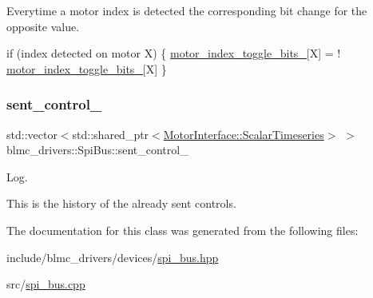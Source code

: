 Everytime a motor index is detected the corresponding bit change for the opposite value. 


\begin{DoxyCode}
\textcolor{keywordflow}{if} (index detected on motor X)
\{
    \hyperlink{classblmc__drivers_1_1SpiBus_a5805dd95171df8f26efdae85ea02662c}{motor\_index\_toggle\_bits\_}[X] = !
      \hyperlink{classblmc__drivers_1_1SpiBus_a5805dd95171df8f26efdae85ea02662c}{motor\_index\_toggle\_bits\_}[X]
\}
\end{DoxyCode}
 \mbox{\label{classblmc__drivers_1_1SpiBus_a9c17b8887fc58ca1d5bfb1d5c2fd1e8a}} 
\subsubsection{\texorpdfstring{sent\+\_\+control\+\_\+}{sent\_control\_}}
{\footnotesize\ttfamily std\+::vector$<$std\+::shared\+\_\+ptr$<$\hyperlink{classblmc__drivers_1_1MotorInterface_a49b8fc916b9f9debbd7b0988463db5cd}{Motor\+Interface\+::\+Scalar\+Timeseries}$>$ $>$ blmc\+\_\+drivers\+::\+Spi\+Bus\+::sent\+\_\+control\+\_\+\hspace{0.3cm}{\ttfamily [private]}}



Log. 

This is the history of the already sent controls. 

The documentation for this class was generated from the following files\+:\begin{DoxyCompactItemize}
\item 
include/blmc\+\_\+drivers/devices/\hyperlink{spi__bus_8hpp}{spi\+\_\+bus.\+hpp}\item 
src/\hyperlink{spi__bus_8cpp}{spi\+\_\+bus.\+cpp}\end{DoxyCompactItemize}
